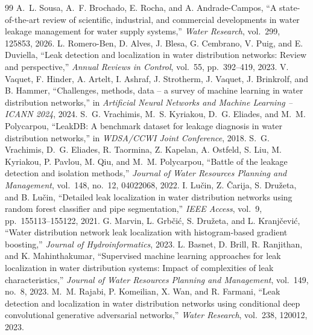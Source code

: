 \documentclass[11pt,letterpaper]{report}
\theoremstyle{definition}
\theoremstyle{plain}
\theoremstyle{remark}
\begin{document}
\renewcommand{\bibname}{References}
\clearpage{}
\begin{thebibliography}{99}
 A.~L. Sousa, A.~F. Brochado, E. Rocha, and A. Andrade-Campos, ``A state-of-the-art review of scientific, industrial, and commercial developments in water leakage management for water supply systems,'' \textit{Water Research}, vol.~299, 125853, 2026.
 L. Romero-Ben, D. Alves, J. Blesa, G. Cembrano, V. Puig, and E. Duviella, ``Leak detection and localization in water distribution networks: Review and perspective,'' \textit{Annual Reviews in Control}, vol.~55, pp.~392--419, 2023.
 V. Vaquet, F. Hinder, A. Artelt, I. Ashraf, J. Strotherm, J. Vaquet, J. Brinkrolf, and B. Hammer, ``Challenges, methods, data -- a survey of machine learning in water distribution networks,'' in \textit{Artificial Neural Networks and Machine Learning -- ICANN 2024}, 2024.
 S.~G. Vrachimis, M.~S. Kyriakou, D.~G. Eliades, and M.~M. Polycarpou, ``LeakDB: A benchmark dataset for leakage diagnosis in water distribution networks,'' in \textit{WDSA/CCWI Joint Conference}, 2018.
 S.~G. Vrachimis, D.~G. Eliades, R. Taormina, Z. Kapelan, A. Ostfeld, S. Liu, M. Kyriakou, P. Pavlou, M. Qiu, and M.~M. Polycarpou, ``Battle of the leakage detection and isolation methods,'' \textit{Journal of Water Resources Planning and Management}, vol.~148, no.~12, 04022068, 2022.
 I. Lu\v{c}in, Z. {\v{C}}arija, S. Dru\v{z}eta, and B. Lu\v{c}in, ``Detailed leak localization in water distribution networks using random forest classifier and pipe segmentation,'' \textit{IEEE Access}, vol.~9, pp.~155113--155122, 2021.
 G. Marvin, L. Grb\v{c}i\'{c}, S. Dru\v{z}eta, and L. Kranj\v{c}evi\'{c}, ``Water distribution network leak localization with histogram-based gradient boosting,'' \textit{Journal of Hydroinformatics}, 2023.
 L. Basnet, D. Brill, R. Ranjithan, and K. Mahinthakumar, ``Supervised machine learning approaches for leak localization in water distribution systems: Impact of complexities of leak characteristics,'' \textit{Journal of Water Resources Planning and Management}, vol.~149, no.~8, 2023.
 M.~M. Rajabi, P. Komeilian, X. Wan, and R. Farmani, ``Leak detection and localization in water distribution networks using conditional deep convolutional generative adversarial networks,'' \textit{Water Research}, vol.~238, 120012, 2023.

\end{thebibliography}
\end{document}
